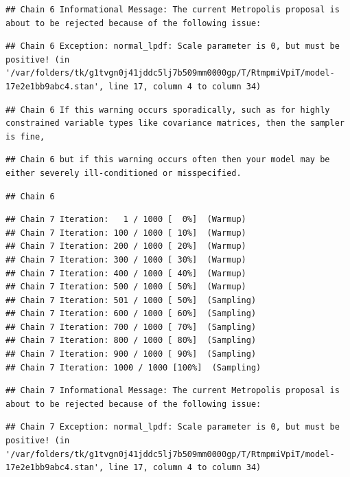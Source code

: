 \documentclass[
]{book}
\begin{document}
\begin{verbatim}
## Chain 6 Informational Message: The current Metropolis proposal is about to be rejected because of the following issue:
\end{verbatim}

\begin{verbatim}
## Chain 6 Exception: normal_lpdf: Scale parameter is 0, but must be positive! (in '/var/folders/tk/g1tvgn0j41jddc5lj7b509mm0000gp/T/RtmpmiVpiT/model-17e2e1bb9abc4.stan', line 17, column 4 to column 34)
\end{verbatim}

\begin{verbatim}
## Chain 6 If this warning occurs sporadically, such as for highly constrained variable types like covariance matrices, then the sampler is fine,
\end{verbatim}

\begin{verbatim}
## Chain 6 but if this warning occurs often then your model may be either severely ill-conditioned or misspecified.
\end{verbatim}

\begin{verbatim}
## Chain 6
\end{verbatim}

\begin{verbatim}
## Chain 7 Iteration:   1 / 1000 [  0%]  (Warmup) 
## Chain 7 Iteration: 100 / 1000 [ 10%]  (Warmup) 
## Chain 7 Iteration: 200 / 1000 [ 20%]  (Warmup) 
## Chain 7 Iteration: 300 / 1000 [ 30%]  (Warmup) 
## Chain 7 Iteration: 400 / 1000 [ 40%]  (Warmup) 
## Chain 7 Iteration: 500 / 1000 [ 50%]  (Warmup) 
## Chain 7 Iteration: 501 / 1000 [ 50%]  (Sampling) 
## Chain 7 Iteration: 600 / 1000 [ 60%]  (Sampling) 
## Chain 7 Iteration: 700 / 1000 [ 70%]  (Sampling) 
## Chain 7 Iteration: 800 / 1000 [ 80%]  (Sampling) 
## Chain 7 Iteration: 900 / 1000 [ 90%]  (Sampling) 
## Chain 7 Iteration: 1000 / 1000 [100%]  (Sampling)
\end{verbatim}

\begin{verbatim}
## Chain 7 Informational Message: The current Metropolis proposal is about to be rejected because of the following issue:
\end{verbatim}

\begin{verbatim}
## Chain 7 Exception: normal_lpdf: Scale parameter is 0, but must be positive! (in '/var/folders/tk/g1tvgn0j41jddc5lj7b509mm0000gp/T/RtmpmiVpiT/model-17e2e1bb9abc4.stan', line 17, column 4 to column 34)
\end{verbatim}
\end{document}
